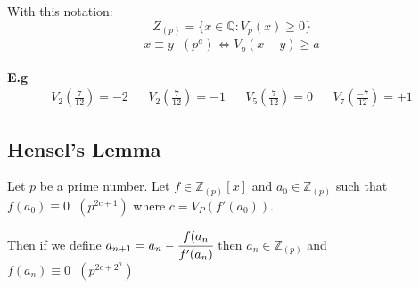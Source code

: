 \documentclass[11pt]{article}
\begin{document}
With this notation:
\begin{equation*}
	Z_{(p)} = \{ x\in \mathbb{Q} : V_p(x) \geq 0 \}
\end{equation*}
\begin{align*}
	x \equiv y \hspace{7pt} (p^{a}) \iff V_p(x-y) \geq a
\end{align*}

\textbf{E.g} 
\begin{align*}
	V_2(\frac{7}{12}) =-2 && V_2(\frac{7}{12}) =-1&&   V_5(\frac{7}{12}) =0 && V_7(\frac{-7}{12}) =+1  
\end{align*}


\subsection{Hensel's Lemma}
Let $p$ be a prime number. Let $f \in \mathbb{Z}_{(p)}[x]$ and $a_0 \in \mathbb{Z}_{(p)}$ such that $f(a_0) \equiv 0 \hspace{7pt} (p^{2c+1})$ where $c= V_P(f'(a_0))$.

Then if we define $a_{n+1} = a_n - \cfrac{f(a_n}{f'(a_n)}$ then $a_n \in \mathbb{Z}_{(p)}$ and $f(a_n) \equiv 0 \hspace{7pt} (p^{2c+2^n})$ 
\end{document}
